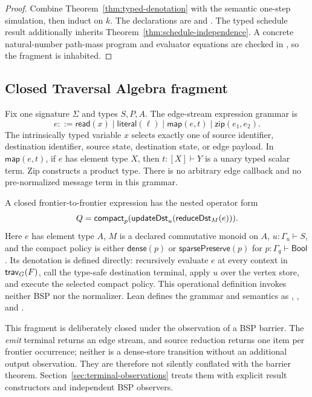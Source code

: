 \begin{proof}
Combine Theorem~\ref{thm:typed-denotation} with the semantic one-step
simulation, then induct on $k$.  The declarations are
 and .
The typed schedule result  additionally
inherits Theorem~\ref{thm:schedule-independence}.  A concrete natural-number
path-mass program and evaluator equations are checked in
, so the fragment is inhabited.
\end{proof}

\subsection{Closed Traversal Algebra fragment}

\begin{definition}
Fix one signature $\Sigma$ and types $S,P,A$.  The edge-stream expression
grammar is
\[
 e ::= \mathsf{read}(x)\mid\mathsf{literal}(\ell)
       \mid\mathsf{map}(e,t)\mid\mathsf{zip}(e_1,e_2).
\]
The intrinsically typed variable $x$ selects exactly one of source identifier,
destination identifier, source state, destination state, or edge payload.
In $\mathsf{map}(e,t)$, if $e$ has element type $X$, then
$t:[X]\vdash Y$ is a unary typed scalar term.  Zip constructs a product type.
There is no arbitrary edge callback and no pre-normalized message term in this
grammar.

A closed frontier-to-frontier expression has the nested operator form
\[
 Q=\mathsf{compact}_p
      (\mathsf{updateDst}_u(\mathsf{reduceDst}_M(e))).
\]
Here $e$ has element type $A$, $M$ is a declared commutative monoid on $A$,
$u:\Gamma_u\vdash S$, and the compact policy is either
$\mathsf{dense}(p)$ or $\mathsf{sparsePreserve}(p)$ for
$p:\Gamma_q\vdash\mathsf{Bool}$.  Its denotation is defined directly:
recursively evaluate $e$ at every context in $\mathsf{trav}_G(F)$, call the type-safe
\TA{} destination terminal, apply $u$ over the vertex store, and execute the
selected compact policy.  This operational definition invokes neither BSP nor
the normalizer.  Lean defines the grammar and semantics as
,
, and .
\end{definition}

This fragment is deliberately closed under the observation of a BSP barrier.
The \emph{emit} terminal returns an edge stream, and source reduction returns
one item per frontier occurrence; neither is a dense-store transition without
an additional output observation.  They are therefore not silently conflated
with the barrier theorem.  Section~\ref{sec:terminal-observations} treats them
with explicit result constructors and independent BSP observers.

